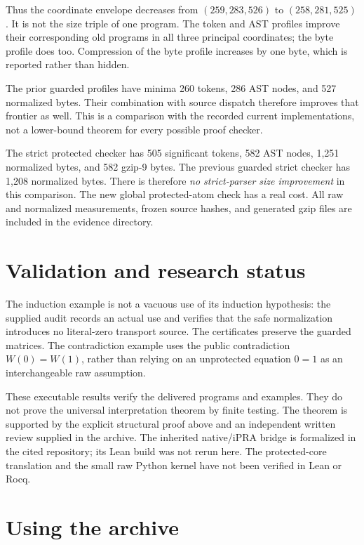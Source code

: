 \documentclass[11pt,letterpaper]{article}
\theoremstyle{definition}\newtheorem{definition}[theorem]{Definition}
\theoremstyle{remark}\newtheorem{remark}[theorem]{Remark}
\begin{document}
Thus the coordinate envelope decreases from \((259,283,526)\) to
\((258,281,525)\). It is not the size triple of one program.
The token and AST profiles improve their corresponding old programs
in all three principal coordinates; the byte profile does too.
Compression of the byte profile increases by one byte, which is
reported rather than hidden.

The prior guarded profiles have minima 260 tokens, 286 AST nodes,
and 527 normalized bytes. Their combination with source dispatch
therefore improves that frontier as well. This is a comparison with
the recorded current implementations, not a lower-bound theorem for
every possible proof checker.

The strict protected checker has 505 significant tokens, 582 AST
nodes, 1,251 normalized bytes, and 582 gzip-9 bytes. The previous
guarded strict checker has 1,208 normalized bytes. There is therefore
\emph{no strict-parser size improvement} in this comparison. The new
global protected-atom check has a real cost. All raw and normalized
measurements, frozen source hashes, and generated gzip files are
included in the evidence directory.

\section{Validation and research status}\label{sec:validation}



The induction example is not a vacuous use of its induction
hypothesis: the supplied audit records an actual use and verifies
that the safe normalization introduces no literal-zero transport
source. The certificates preserve the guarded matrices. The
contradiction example uses the public contradiction
\(W(0)=W(1)\), rather than relying on an unprotected equation
\(0=1\) as an interchangeable raw assumption.

These executable results verify the delivered programs and examples.
They do not prove the universal interpretation theorem by finite
testing. The theorem is supported by the explicit structural proof
above and an independent written review supplied in the archive.
The inherited native/iPRA bridge is formalized in the cited repository;
its Lean build was not rerun here. The protected-core translation and
the small raw Python kernel have not been verified in Lean or Rocq.

\section{Using the archive}
\end{document}
